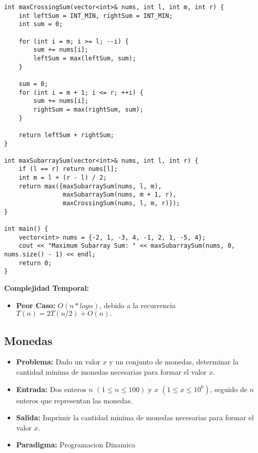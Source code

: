         \begin{lstlisting}[style=cpp]
int maxCrossingSum(vector<int>& nums, int l, int m, int r) {
    int leftSum = INT_MIN, rightSum = INT_MIN;
    int sum = 0;

    for (int i = m; i >= l; --i) {
        sum += nums[i];
        leftSum = max(leftSum, sum);
    }

    sum = 0;
    for (int i = m + 1; i <= r; ++i) {
        sum += nums[i];
        rightSum = max(rightSum, sum);
    }

    return leftSum + rightSum;
}

int maxSubarraySum(vector<int>& nums, int l, int r) {
    if (l == r) return nums[l];
    int m = l + (r - l) / 2;
    return max({maxSubarraySum(nums, l, m),
                maxSubarraySum(nums, m + 1, r),
                maxCrossingSum(nums, l, m, r)});
}

int main() {
    vector<int> nums = {-2, 1, -3, 4, -1, 2, 1, -5, 4};
    cout << "Maximum Subarray Sum: " << maxSubarraySum(nums, 0, nums.size() - 1) << endl;
    return 0;
}
    \end{lstlisting}
    \textbf{Complejidad Temporal: }
    \begin{itemize}
        \item \textbf{Peor Caso: }$O(n *logn)$, debido a la recurrencia $T(n) = 2T(n/2) + O(n).$

    \end{itemize}


\subsection{Monedas}

\begin{itemize}
  \item \textbf{Problema: }Dado un valor $x$ y un conjunto de monedas, determinar la cantidad minima de monedas necesarias para formar el valor $x$. 
  \item \textbf{Entrada: }Dos enteros $n$ $(1 \leq n \leq 100)$ y $x$ $(1 \leq x \leq 10^6)$, seguido de $n$ enteros que representan las monedas. 
  \item \textbf{Salida: }Imprimir la cantidad minima de monedas necesarias para formar el valor $x$. 

  \item \textbf{Paradigma: } Programacion Dinamica
\end{itemize}


